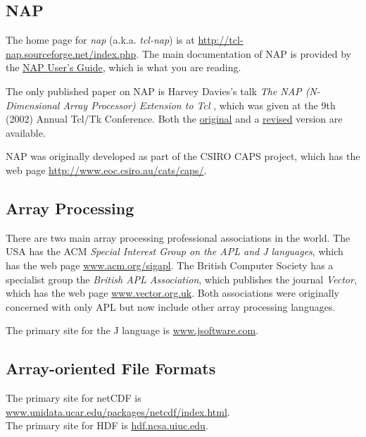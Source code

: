   \subsection{
    \label{NAP}NAP
  }
The home page for 
  \emph{nap} (a.k.a.
  \emph{tcl-nap}) is at 
  \href{http://tcl-nap.sourceforge.net/index.php}{http://tcl-nap.sourceforge.net/index.php}.
The main documentation of NAP is provided by the
  \href{http://tcl-nap.sourceforge.net/nap_users_guide.pdf}{NAP User's Guide},
which is what you are reading.
  \par The only published paper on NAP is Harvey Davies's talk 
  \emph{The NAP (N-Dimensional Array Processor) Extension to Tcl}
  , which was given at the 9th (2002) Annual Tcl/Tk Conference.
Both the
\href{http://aspn.activestate.com/ASPN/Tcl/TclConferencePapers2002/Tcl2002papers/davies-nap/nap.pdf}{original}
and a
  \href{http://tcl-nap.sourceforge.net/nap_paper2002.pdf}{revised} version are available.
  \par NAP was originally developed as part of the CSIRO CAPS project,
  which has the web page 
  \href{http://www.eoc.csiro.au/cats/caps/}{http://www.eoc.csiro.au/cats/caps/}.

  \subsection{
    \label{array}Array Processing
  }
There are two main array processing professional associations in
  the world. The USA has the ACM 
  \emph{Special Interest Group on the APL and J languages}, which has
  the web page 
  \href{http://www.acm.org/sigapl}{www.acm.org/sigapl}. The
  British Computer Society has a specialist group the 
  \emph{British APL Association}, which publishes the journal 
  \emph{Vector}, which has the web page 
  \href{http://www.vector.org.uk}{www.vector.org.uk}. Both
  associations were originally concerned with only APL but now include
  other array processing languages.
  \par The primary site for the J language is 
  \href{http://www.jsoftware.com}{www.jsoftware.com}.
  \subsection{
    \label{file}Array-oriented File Formats
  }
The primary site for netCDF is 
  \href{http://www.unidata.ucar.edu/packages/netcdf/index.html}{www.unidata.ucar.edu/packages/netcdf/index.html}.
  \\The primary site for HDF is 
  \href{http://hdf.ncsa.uiuc.edu}{hdf.ncsa.uiuc.edu}.
